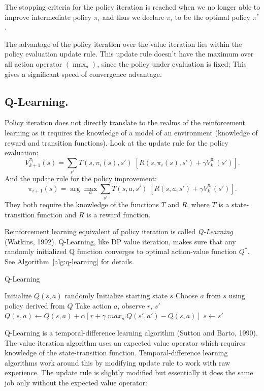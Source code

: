 The stopping criteria for the policy iteration is reached when we no longer able to improve intermediate policy $ \pi_{i} $ and thus we declare $ \pi_{i} $ to be the optimal policy $\pi^{*}$.

The advantage of the policy iteration over the value iteration lies within the policy evaluation update rule. This update rule doesn't have the maximum over all action operator $(\max_{a})$, since the policy under evaluation is fixed; This gives a significant speed of convergence advantage.


\subsection{Q-Learning.}
\label{sec:q-learning}
Policy iteration does not directly translate to the realms of the reinforcement learning as it requires the knowledge of a model of an environment (knowledge of reward and transition functions). Look at the update rule for the policy evaluation:
$$ V_{k+1}^{\pi_{i}}(s) = \displaystyle\sum_{s'}T(s,\pi_{i}(s),s')\;[R(s,\pi_{i}(s),s')+\gamma V_{k}^{\pi_{i}}(s')]. $$
And the update rule for the policy improvement:
$$ \pi_{i+1}(s) = \arg\max_{a}\displaystyle\sum_{s'}T(s,a,s')\;[R(s,a,s')+\gamma V_{k}^{\pi_{i}}(s')]. $$
They both require the knowledge of the functions $T$ and $R$, where $T$ is a state-transition function and $R$ is a reward function.

Reinforcement learning equivalent of policy iteration is called \textit{Q-Learning} (Watkins, 1992\nocite{watkins1992q}). Q-Learning, like DP value iteration, makes sure that any randomly initialized Q function converges to optimal action-value function $Q^{*}$. See Algorithm~\ref{alg:q-learning} for details.
\begin{algorithm}[tb]
   \caption{Q-Learning}
   \label{alg:q-learning}
\begin{algorithmic}
    Initialize $Q(s,a)$ randomly
   \REPEAT
       \STATE Initialize starting state $s$
       \REPEAT
           \STATE Choose $a$ from $s$ using policy derived from $Q$
           \STATE Take action $a$, observe $r$, $s'$
           \STATE $Q(s,a) \leftarrow Q(s,a) + \alpha [r + \gamma\; max_{a'}Q(s',a') - Q(s,a)] $
           \STATE $ s \leftarrow s'$
\end{algorithmic}
\end{algorithm}
Q-Learning is a temporal-difference learning algorithm (Sutton and Barto, 1990\nocite{Sutton90time-derivativemodels}). The value iteration algorithm uses an expected value operator which requires knowledge of the state-transition function. Temporal-difference learning algorithms work around this by modifying update rule to work with raw experience. The update rule is slightly modified but essentially it does the same job only without the expected value operator:

